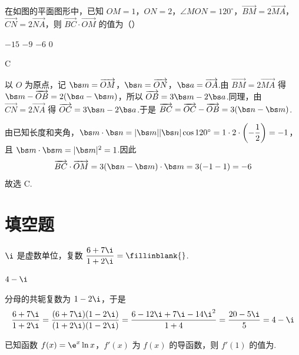 \begin{problem}
在如图的平面图形中，已知 \(OM=1\)，\(ON=2\)，\(\angle MON=120^\circ\)，\(\overrightarrow{BM}=2\overrightarrow{MA}\)，\(\overrightarrow{CN}=2\overrightarrow{NA}\)，则 \(\overrightarrow{BC}\cdot\overrightarrow{OM}\) 的值为（\quad）


\choices
    {\(-15\)}
    {\(-9\)}
    {\(-6\)}
    {\(0\)}
\end{problem}

\begin{answer}
C
\end{answer}

\begin{solution}
以 \(O\) 为原点，记 \(\bs m=\overrightarrow{OM}\)，\(\bs n=\overrightarrow{ON}\)，\(\bs a=\overrightarrow{OA}\).由 \(\overrightarrow{BM}=2\overrightarrow{MA}\) 得
\(\bs m-\overrightarrow{OB}=2(\bs a-\bs m)\)，所以 \(\overrightarrow{OB}=3\bs m-2\bs a\).同理，由 \(\overrightarrow{CN}=2\overrightarrow{NA}\) 得 \(\overrightarrow{OC}=3\bs n-2\bs a\).于是
\(\overrightarrow{BC}=\overrightarrow{OC}-\overrightarrow{OB}=3(\bs n-\bs m)\).

由已知长度和夹角，\(\bs m\cdot\bs n=|\bs m||\bs n|\cos120^\circ=1\cdot2\cdot\left(-\dfrac12\right)=-1\)，且 \(\bs m\cdot\bs m=|\bs m|^2=1\).因此
\[
\overrightarrow{BC}\cdot\overrightarrow{OM}=3(\bs n-\bs m)\cdot\bs m=3(-1-1)=-6
\]
故选 C.
\end{solution}

\section{填空题}

\begin{problem}
\(\i\) 是虚数单位，复数 \(\dfrac{6+7\i}{1+2\i}=\fillinblank{}\).
\end{problem}

\begin{answer}
\(4-\i\)
\end{answer}

\begin{solution}
分母的共轭复数为 \(1-2\i\)，于是
\[
\frac{6+7\i}{1+2\i}=\frac{(6+7\i)(1-2\i)}{(1+2\i)(1-2\i)}=\frac{6-12\i+7\i-14\i^2}{1+4}=\frac{20-5\i}{5}=4-\i
\]
\end{solution}

\begin{problem}
已知函数 \(f(x)=\e^x\ln x\)，\(f'(x)\) 为 \(f(x)\) 的导函数，则 \(f'(1)\) 的值为\fillinblank{}.
\end{problem}

